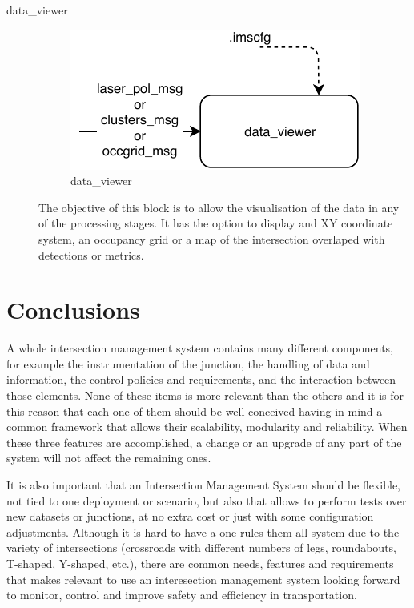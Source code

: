 \begin{description}
\item[data\_viewer] \hfill
\begin{figure}[ht!]
\centering
\includegraphics[scale=1]{fig/3/data_viewer.pdf}
\caption{data\_viewer}
\label{data_viewer}
\end{figure}

The objective of this block is to allow the visualisation of the data in any of the processing stages. It has the option to display and XY coordinate system, an occupancy grid or a map of the intersection overlaped with detections or metrics.

\end{description}

\section{Conclusions}

A whole intersection management system contains many different components, for example the instrumentation of the junction, the handling of data and information, the control policies and requirements, and the interaction between those elements. None of these items is more relevant than the others and it is for this reason that each one of them should be well conceived having in mind a common framework that allows their scalability, modularity and reliability. When these three features are accomplished, a change or an upgrade of any part of the system will not affect the remaining ones.

It is also important that an Intersection Management System should be flexible, not tied to one deployment or scenario, but also that allows to perform tests over new datasets or junctions, at no extra cost or just with some configuration adjustments. Although it is hard to have a one-rules-them-all system due to the variety of intersections (crossroads with different numbers of legs, roundabouts, T-shaped, Y-shaped, etc.), there are common needs, features and requirements that makes relevant to use an interesection management system looking forward to monitor, control and improve safety and efficiency in transportation.